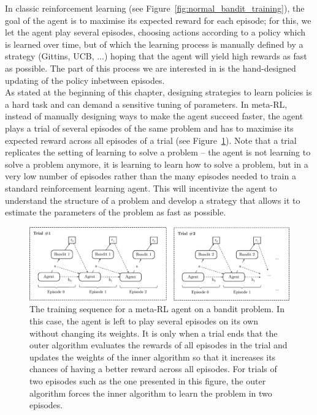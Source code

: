 In classic reinforcement learning (see Figure~\ref{fig:normal_bandit_training}),
the goal of the agent is to maximise its
expected reward for each episode; for this, we let the agent play several
episodes, choosing actions according to a policy which is learned over time, 
but of which the learning process is manually defined by a strategy (Gittins,
UCB, ...) hoping that the agent will yield high rewards as fast as possible.
The part of this process we are interested in is the hand-designed updating of
the policy inbetween episodes.\\

As stated at the beginning of this chapter, designing strategies to learn
policies is a hard task and can demand a sensitive tuning of parameters.
In meta-RL, instead of manually designing ways to make the agent succeed faster,
the agent plays a trial of several episodes of the same problem and has to
maximise its expected reward across all episodes of a trial (see 
Figure~\ref{fig:meta_bandit_training}). Note that a trial replicates the setting
of learning to solve a problem -- the agent is not learning to solve a 
problem anymore, it is learning to learn how to solve a problem, but in 
a very low number of episodes rather than the many episodes needed 
to train a standard reinforcement learning agent. This will incentivize the agent
to understand the structure of a problem and develop a strategy that allows it 
to estimate the parameters of the problem as fast as possible.\\

\begin{figure}
	\centering
	\includegraphics[width=\linewidth]{fig/meta_bandit_training.eps}
	\caption{The training sequence for a meta-RL agent on a bandit problem.
	In this case, the agent is left to play several episodes on its own
	without changing its weights. It is only when a trial ends that the
	outer algorithm evaluates the rewards of all episodes in the trial and
	updates the weights of the inner algorithm so that it increases its
	chances of having a better reward across all episodes. For trials of 
	two episodes such as the one presented in this figure, the outer
	algorithm forces the inner algorithm to learn the problem in 
	two episodes.}
	\label{fig:meta_bandit_training}
\end{figure}

